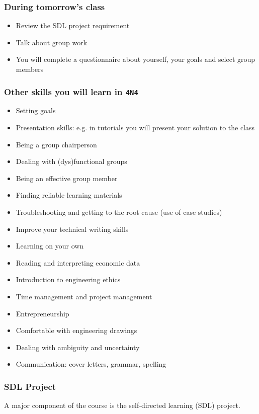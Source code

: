 \begin{frame}\frametitle{During tomorrow's class}
	\begin{itemize}
		\item	Review the SDL project requirement
		\item	Talk about group work
		\item	You will complete a questionnaire about yourself, your goals and select group members
	\end{itemize}
\end{frame}

\begin{frame}\frametitle{Other skills you will learn in \texttt{4N4}}
	\begin{itemize}
		\item	Setting goals
		\item	Presentation skills: e.g. in tutorials you will present your solution to the class
		\item	Being a group chairperson
		\item	Dealing with (dys)functional groups
		\item	Being an effective group member
		\item	Finding reliable learning materials
		\item	Troubleshooting and getting to the root cause {\scriptsize (use of case studies)}
		\item	Improve your technical writing skills
		\item	Learning on your own
		\item	Reading and interpreting economic data
		\item	Introduction to engineering ethics
		\item	Time management and project management
		\item	Entrepreneurship
		\item	Comfortable with engineering drawings
		\item	Dealing with ambiguity and uncertainty		
		\item	Communication: cover letters, grammar, spelling
	\end{itemize}	
\end{frame}

\begin{frame}\frametitle{SDL Project}
	A major component of the course is the self-directed learning (SDL) project.
\end{frame}

